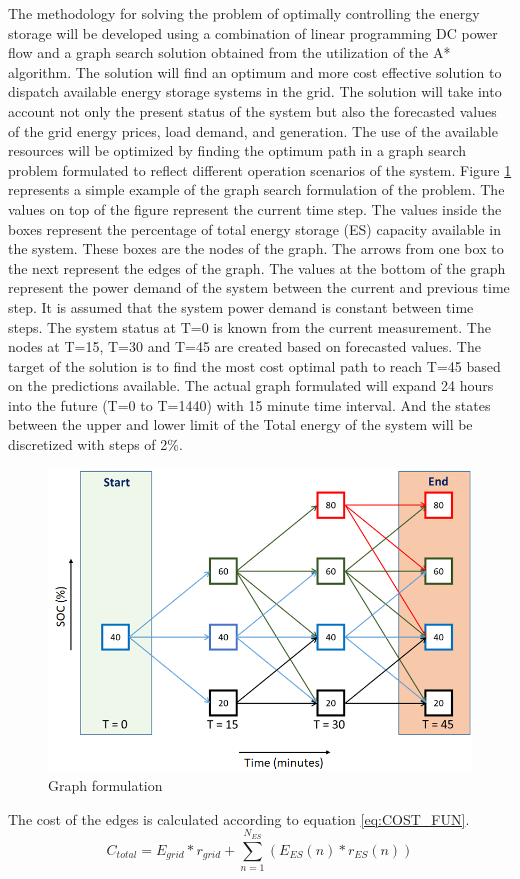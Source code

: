 \documentclass[journal,12pt,onecolumn]{IEEEtran}
\begin{document}
The methodology for solving the problem of optimally controlling the energy storage will be developed using a combination of linear programming DC power flow and a graph search solution obtained from the utilization of the A* \cite{a8book} algorithm. The solution will find an optimum and more cost effective solution to dispatch available energy storage systems in the grid. The solution will take into account not only the present status of the system but also the forecasted values of the grid energy prices, load demand, and generation. The use of the available resources will be optimized by finding the optimum path in a graph search problem formulated to reflect different operation scenarios of the system. Figure \ref{fig:F1_1_Dis} represents a simple example of the graph search formulation of the problem. The values on top of the figure represent the current time step. The values inside the boxes represent the percentage of total energy storage (ES) capacity available in the system. These boxes are the nodes of the graph. The arrows from one box to the next represent the edges of the graph. The values at the bottom of the graph represent the power demand of the system between the current and previous time step. It is assumed that the system power demand is constant between time steps. The system status at T=0 is known from the current measurement. The nodes at T=15, T=30 and T=45 are created based on forecasted values. The target of the solution is to find the most cost optimal path to reach T=45 based on the predictions available. The actual graph formulated will expand 24 hours into the future (T=0 to T=1440) with 15 minute time interval. And the states between the upper and lower limit of the Total energy of the system will be discretized with steps of 2\%.

\begin{figure}[!ht]
\centering
\includegraphics[width = 0.5\linewidth]{figs/F1_1_Dis.png}
\caption{Graph formulation}
\label{fig:F1_1_Dis}
\end{figure}

The cost of the edges is calculated according to equation \ref{eq:COST_FUN}. 
\begin{equation}
\label{eq:COST_FUN}
    C_{total} = E_{grid}*r_{grid} + \sum_{n=1}^{N_{ES}}(E_{ES}(n)*r_{ES}(n))
\end{equation}
\end{document}
